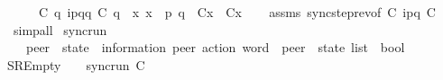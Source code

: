 \begin{isabellebody}
\ \ \ \ \ {\isachardoublequoteopen}C{}\ q\ {\isasymmidarrow}{\isacharquery}{\kern0pt}{\isasymlangle}{\isacharparenleft}{\kern0pt}i\isactrlbsup p{\isasymrightarrow}q\isactrlesup {\isacharparenright}{\kern0pt}{\isasymrangle}{\isasymrightarrow}q\ {\isacharparenleft}{\kern0pt}C{}\ q{\isacharparenright}{\kern0pt}{\isachardoublequoteclose}\ \ {\isachardoublequoteopen}{\isasymforall}x{\isachardot}{\kern0pt}\ x\ {\isasymnotin}\ {\isacharbraceleft}{\kern0pt}p{\isacharcomma}{\kern0pt}\ q{\isacharbraceright}{\kern0pt}\ {\isasymlongrightarrow}\ C{}{\isacharparenleft}{\kern0pt}x{\isacharparenright}{\kern0pt}\ {\isacharequal}{\kern0pt}\ C{}{\isacharparenleft}{\kern0pt}x{\isacharparenright}{\kern0pt}{\isachardoublequoteclose}\isanewline
%
\isadelimproof
\ \ %
\endisadelimproof
%
\isatagproof
{}\isamarkupfalse%
\ assms\ sync{\isacharunderscore}{\kern0pt}step{\isacharunderscore}{\kern0pt}rev{\isacharbrackleft}{\kern0pt}of\ C{}\ {\isachardoublequoteopen}{\isacharbang}{\kern0pt}{\isasymlangle}{\isacharparenleft}{\kern0pt}i\isactrlbsup p{\isasymrightarrow}q\isactrlesup {\isacharparenright}{\kern0pt}{\isasymrangle}{\isachardoublequoteclose}\ C{}{\isacharbrackright}{\kern0pt}\isanewline
\ \ \isamarkupfalse%
\ simp{\isacharunderscore}{\kern0pt}all%
\endisatagproof
{\isafoldproof}%
%
\isadelimproof
\isanewline
%
\endisadelimproof
\isanewline
{}\isamarkupfalse%
\ sync{\isacharunderscore}{\kern0pt}run\isanewline
\ \ {\isacharcolon}{\kern0pt}{\isacharcolon}{\kern0pt}\ {\isachardoublequoteopen}{\isacharparenleft}{\kern0pt}{\isacharprime}{\kern0pt}peer\ {\isasymRightarrow}\ {\isacharprime}{\kern0pt}state{\isacharparenright}{\kern0pt}\ {\isasymRightarrow}\ {\isacharparenleft}{\kern0pt}{\isacharprime}{\kern0pt}information{\isacharcomma}{\kern0pt}\ {\isacharprime}{\kern0pt}peer{\isacharparenright}{\kern0pt}\ action\ word\ {\isasymRightarrow}\ {\isacharparenleft}{\kern0pt}{\isacharprime}{\kern0pt}peer\ {\isasymRightarrow}\ {\isacharprime}{\kern0pt}state{\isacharparenright}{\kern0pt}\ list\ {\isasymRightarrow}\ bool{\isachardoublequoteclose}\isanewline
\ \ \isanewline
SREmpty{\isacharcolon}{\kern0pt}\ \ \ \ {\isachardoublequoteopen}sync{\isacharunderscore}{\kern0pt}run\ C\ {\isasymepsilon}\ {\isacharparenleft}{\kern0pt}{\isacharbrackleft}{\kern0pt}{\isacharbrackright}{\kern0pt}{\isacharparenright}{\kern0pt}{\isachardoublequoteclose}\ {\isacharbar}{\kern0pt}\isanewline

\end{isabellebody}
